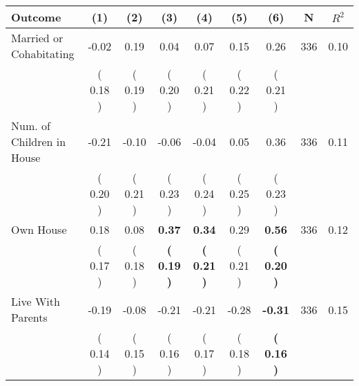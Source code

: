\begin{tabular}{lcccccccc}
\toprule
 \textbf{Outcome} & \textbf{(1)} & \textbf{(2)} & \textbf{(3)} & \textbf{(4)} & \textbf{(5)} & \textbf{(6)} & \textbf{N} & \textbf{$ R^2$} \\
\midrule
Married or Cohabitating &     -0.02 &      0.19 &      0.04 &      0.07 &      0.15 &      0.26 & 336 &       0.10 \\ 
 & (     0.18 ) & (     0.19 ) & (     0.20 ) & (     0.21 ) & (     0.22 ) & (     0.21 ) & \\
Num. of Children in House &     -0.21 &     -0.10 &     -0.06 &     -0.04 &      0.05 &      0.36 & 336 &       0.11 \\ 
 & (     0.20 ) & (     0.21 ) & (     0.23 ) & (     0.24 ) & (     0.25 ) & (     0.23 ) & \\
Own House &      0.18 &      0.08 & \textbf{     0.37} & \textbf{     0.34} &      0.29 & \textbf{     0.56} & 336 &       0.12 \\ 
 & (     0.17 ) & (     0.18 ) & \textbf{(     0.19 )} & \textbf{(     0.21 )} & (     0.21 ) & \textbf{(     0.20 )} & \\
Live With Parents &     -0.19 &     -0.08 &     -0.21 &     -0.21 &     -0.28 & \textbf{    -0.31} & 336 &       0.15 \\ 
 & (     0.14 ) & (     0.15 ) & (     0.16 ) & (     0.17 ) & (     0.18 ) & \textbf{(     0.16 )} & \\
\bottomrule
\end{tabular}
